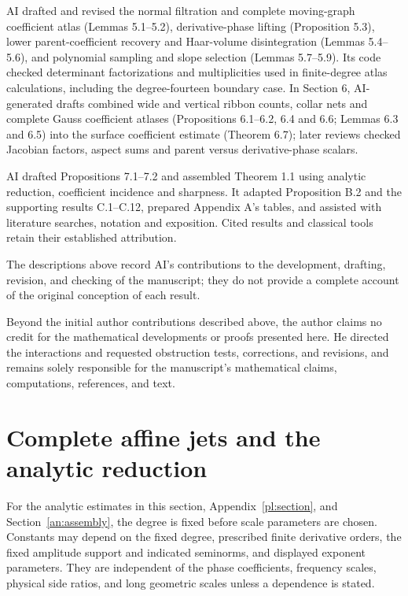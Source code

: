 \documentclass[11pt]{amsart}
\theoremstyle{definition}
\theoremstyle{remark}
\numberwithin{equation}{section}
\begin{document}
AI drafted and revised the normal filtration and complete moving-graph coefficient atlas (Lemmas 5.1--5.2), derivative-phase lifting (Proposition 5.3), lower parent-coefficient recovery and Haar-volume disintegration (Lemmas 5.4--5.6), and polynomial sampling and slope selection (Lemmas 5.7--5.9). Its code checked determinant factorizations and multiplicities used in finite-degree atlas calculations, including the degree-fourteen boundary case. In Section 6, AI-generated drafts combined wide and vertical ribbon counts, collar nets and complete Gauss coefficient atlases (Propositions 6.1--6.2, 6.4 and 6.6; Lemmas 6.3 and 6.5) into the surface coefficient estimate (Theorem 6.7); later reviews checked Jacobian factors, aspect sums and parent versus derivative-phase scalars.

AI drafted Propositions 7.1--7.2 and assembled Theorem 1.1 using analytic reduction, coefficient incidence and sharpness. It adapted Proposition B.2 and the supporting results C.1--C.12, prepared Appendix A's tables, and assisted with literature searches, notation and exposition. Cited results and classical tools retain their established attribution.

The descriptions above record AI's contributions to the development, drafting, revision, and checking of the manuscript; they do not provide a complete account of the original conception of each result.

Beyond the initial author contributions described above, the author claims no credit for the mathematical developments or proofs presented here. He directed the interactions and requested obstruction tests, corrections, and revisions, and remains solely responsible for the manuscript's mathematical claims, computations, references, and text.

\section{Complete affine jets and the analytic reduction}\label{an:section}

For the analytic estimates in this section, Appendix~\ref{pl:section}, and Section~\ref{an:assembly}, the degree is fixed before scale parameters are chosen. Constants may depend on the fixed degree, prescribed finite derivative orders, the fixed amplitude support and indicated seminorms, and displayed exponent parameters. They are independent of the phase coefficients, frequency scales, physical side ratios, and long geometric scales unless a dependence is stated.
\end{document}
